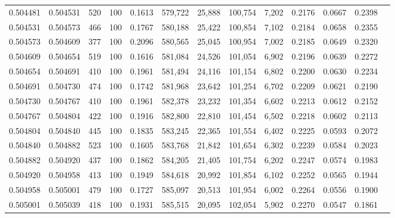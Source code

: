\begin{tabular}{rrrrrrrrrrrrr}
0.504481 & 0.504531 &   520 & 100 &                                     0.1613 & 579,722 &  25,888 & 100,754 &   7,202 & 0.2176 & 0.0667 & 0.2398 \\
0.504531 & 0.504573 &   466 & 100 &                                     0.1767 & 580,188 &  25,422 & 100,854 &   7,102 & 0.2184 & 0.0658 & 0.2355 \\
0.504573 & 0.504609 &   377 & 100 &                                     0.2096 & 580,565 &  25,045 & 100,954 &   7,002 & 0.2185 & 0.0649 & 0.2320 \\
0.504609 & 0.504654 &   519 & 100 &                                     0.1616 & 581,084 &  24,526 & 101,054 &   6,902 & 0.2196 & 0.0639 & 0.2272 \\
0.504654 & 0.504691 &   410 & 100 &                                     0.1961 & 581,494 &  24,116 & 101,154 &   6,802 & 0.2200 & 0.0630 & 0.2234 \\
0.504691 & 0.504730 &   474 & 100 &                                     0.1742 & 581,968 &  23,642 & 101,254 &   6,702 & 0.2209 & 0.0621 & 0.2190 \\
0.504730 & 0.504767 &   410 & 100 &                                     0.1961 & 582,378 &  23,232 & 101,354 &   6,602 & 0.2213 & 0.0612 & 0.2152 \\
0.504767 & 0.504804 &   422 & 100 &                                     0.1916 & 582,800 &  22,810 & 101,454 &   6,502 & 0.2218 & 0.0602 & 0.2113 \\
0.504804 & 0.504840 &   445 & 100 &                                     0.1835 & 583,245 &  22,365 & 101,554 &   6,402 & 0.2225 & 0.0593 & 0.2072 \\
0.504840 & 0.504882 &   523 & 100 &                                     0.1605 & 583,768 &  21,842 & 101,654 &   6,302 & 0.2239 & 0.0584 & 0.2023 \\
0.504882 & 0.504920 &   437 & 100 &                                     0.1862 & 584,205 &  21,405 & 101,754 &   6,202 & 0.2247 & 0.0574 & 0.1983 \\
0.504920 & 0.504958 &   413 & 100 &                                     0.1949 & 584,618 &  20,992 & 101,854 &   6,102 & 0.2252 & 0.0565 & 0.1944 \\
0.504958 & 0.505001 &   479 & 100 &                                     0.1727 & 585,097 &  20,513 & 101,954 &   6,002 & 0.2264 & 0.0556 & 0.1900 \\
0.505001 & 0.505039 &   418 & 100 &                                     0.1931 & 585,515 &  20,095 & 102,054 &   5,902 & 0.2270 & 0.0547 & 0.1861 \\

\end{tabular}
